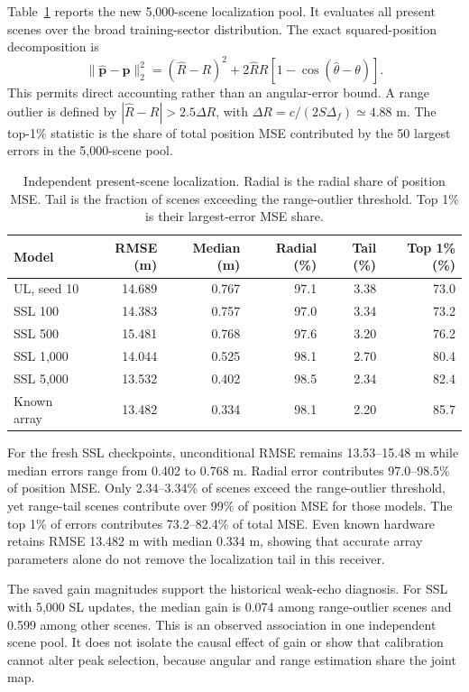 \documentclass[conference]{IEEEtran}
\begin{document}
Table~\ref{tab:localization-final} reports the new 5,000-scene localization pool. It evaluates all present scenes over the broad training-sector distribution. The exact squared-position decomposition is
\begin{equation}
 \|\widehat{\mathbf p}-\mathbf p\|_2^2
 = (\widehat R-R)^2+2\widehat R R[1-\cos(\widehat\theta-\theta)].
 \label{eq:decomp}
\end{equation}
This permits direct accounting rather than an angular-error bound. A range outlier is defined by $|\widehat R-R|>2.5\Delta R$, with $\Delta R=c/(2S\Delta_f)\simeq4.88$ m. The top-1\% statistic is the share of total position MSE contributed by the 50 largest errors in the 5,000-scene pool.
\begin{table}[t]\centering\small
\caption{Independent present-scene localization. Radial is the radial share of position MSE. Tail is the fraction of scenes exceeding the range-outlier threshold. Top 1\% is their largest-error MSE share.}\label{tab:localization-final}
\setlength{\tabcolsep}{3pt}
\begin{tabular}{lrrrrr}\toprule
Model & RMSE (m) & Median (m) & Radial (\%) & Tail (\%) & Top 1\% (\%)\\\midrule
UL, seed 10 & 14.689 & 0.767 & 97.1 & 3.38 & 73.0\\
SSL 100 & 14.383 & 0.757 & 97.0 & 3.34 & 73.2\\
SSL 500 & 15.481 & 0.768 & 97.6 & 3.20 & 76.2\\
SSL 1,000 & 14.044 & 0.525 & 98.1 & 2.70 & 80.4\\
SSL 5,000 & 13.532 & 0.402 & 98.5 & 2.34 & 82.4\\
Known array & 13.482 & 0.334 & 98.1 & 2.20 & 85.7\\
\bottomrule\end{tabular}
\end{table}
For the fresh SSL checkpoints, unconditional RMSE remains 13.53--15.48 m while median errors range from 0.402 to 0.768 m. Radial error contributes 97.0--98.5\% of position MSE. Only 2.34--3.34\% of scenes exceed the range-outlier threshold, yet range-tail scenes contribute over 99\% of position MSE for those models. The top 1\% of errors contributes 73.2--82.4\% of total MSE. Even known hardware retains RMSE 13.482 m with median 0.334 m, showing that accurate array parameters alone do not remove the localization tail in this receiver.

The saved gain magnitudes support the historical weak-echo diagnosis. For SSL with 5,000 SL updates, the median gain is 0.074 among range-outlier scenes and 0.599 among other scenes. This is an observed association in one independent scene pool. It does not isolate the causal effect of gain or show that calibration cannot alter peak selection, because angular and range estimation share the joint map.
\end{document}
